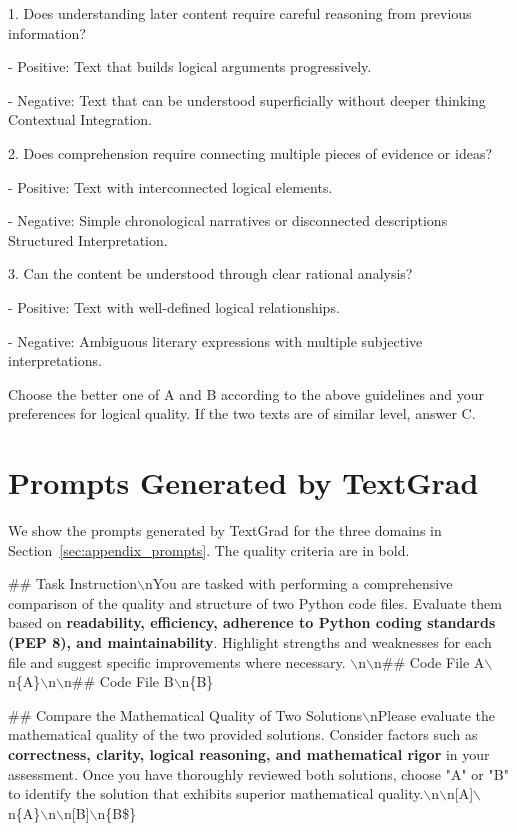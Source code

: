 1. Does understanding later content require careful reasoning from previous
information?

- Positive: Text that builds logical arguments progressively.

- Negative: Text that can be understood superficially without deeper thinking
Contextual Integration.

2. Does comprehension require connecting multiple pieces of evidence or ideas?

- Positive: Text with interconnected logical elements.

- Negative: Simple chronological narratives or disconnected descriptions
Structured Interpretation.

3. Can the content be understood through clear rational analysis?

- Positive: Text with well-defined logical relationships.

- Negative: Ambiguous literary expressions with multiple subjective
interpretations.

Choose the better one of A and B according to the above guidelines and your
preferences for logical quality. If the two texts are of similar level, answer C.

\section{Prompts Generated by TextGrad}
\label{sec:textgrad}

We show the prompts generated by TextGrad for the three domains in Section~\ref{sec:appendix_prompts}.
The quality criteria are in bold.

\begin{tcolorbox}
    [title = {Code}, breakable] \footnotesize \#\# Task Instruction$\backslash$nYou
    are tasked with performing a comprehensive comparison of the quality and structure
    of two Python code files. Evaluate them based on \textbf{readability, efficiency,
    adherence to Python coding standards (PEP 8), and maintainability}.
    Highlight strengths and weaknesses for each file and suggest specific
    improvements where necessary. $\backslash$n$\backslash$n\#\# Code File A$\backslash$n\{A\}$\backslash$n$\backslash$n\#\#
    Code File B$\backslash$n\{B\}
\end{tcolorbox}

\begin{tcolorbox}
    [title = {Math}, breakable] \footnotesize \#\# Compare the Mathematical Quality
    of Two Solutions$\backslash$nPlease evaluate the mathematical quality of the
    two provided solutions. Consider factors such as \textbf{correctness, clarity,
    logical reasoning, and mathematical rigor} in your assessment. Once you have
    thoroughly reviewed both solutions, choose "A" or "B" to identify the solution
    that exhibits superior mathematical quality.$\backslash$n$\backslash$n[A]$\backslash$n\{A\}$\backslash$n$\backslash$n[B]$\backslash$n\{B\$\}
\end{tcolorbox}

